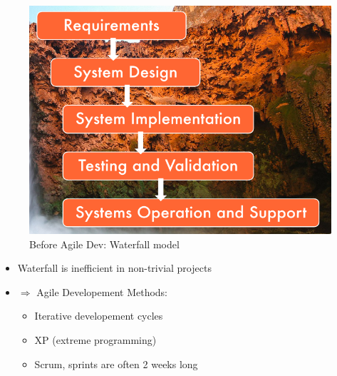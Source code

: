 \documentclass[a4paper]{article}
\begin{document}
\begin{multicols}{3}
\begin{figure}[H]
    \includegraphics[width=\linewidth]{Waterfallmodel.png}
    \caption{Before Agile Dev: Waterfall model}
    \label{fig:waterfallmodel}
\end{figure}

\begin{itemize}
    \item Waterfall is inefficient in non-trivial projects
    \item $\Rightarrow$ Agile Developement Methods:
        \begin{itemize}
            \item Iterative developement cycles
            \item XP (extreme programming)
            \item Scrum, sprints are often 2 weeks long
        \end{itemize}
\end{itemize}


\end{multicols}
\end{document}
